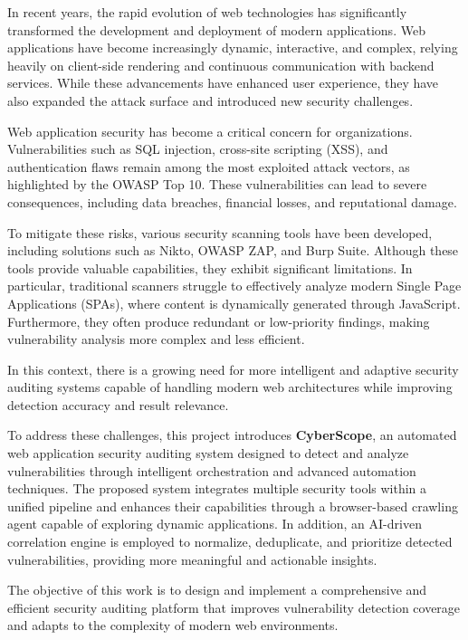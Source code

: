 \indent In recent years, the rapid evolution of web technologies has significantly transformed the development and deployment of modern applications. Web applications have become increasingly dynamic, interactive, and complex, relying heavily on client-side rendering and continuous communication with backend services. While these advancements have enhanced user experience, they have also expanded the attack surface and introduced new security challenges.

\indent Web application security has become a critical concern for organizations. Vulnerabilities such as SQL injection, cross-site scripting (XSS), and authentication flaws remain among the most exploited attack vectors, as highlighted by the OWASP Top 10. These vulnerabilities can lead to severe consequences, including data breaches, financial losses, and reputational damage.

\indent To mitigate these risks, various security scanning tools have been developed, including solutions such as Nikto, OWASP ZAP, and Burp Suite. Although these tools provide valuable capabilities, they exhibit significant limitations. In particular, traditional scanners struggle to effectively analyze modern Single Page Applications (SPAs), where content is dynamically generated through JavaScript. Furthermore, they often produce redundant or low-priority findings, making vulnerability analysis more complex and less efficient.

\indent In this context, there is a growing need for more intelligent and adaptive security auditing systems capable of handling modern web architectures while improving detection accuracy and result relevance.

\indent To address these challenges, this project introduces \textbf{CyberScope}, an automated web application security auditing system designed to detect and analyze vulnerabilities through intelligent orchestration and advanced automation techniques. The proposed system integrates multiple security tools within a unified pipeline and enhances their capabilities through a browser-based crawling agent capable of exploring dynamic applications. In addition, an AI-driven correlation engine is employed to normalize, deduplicate, and prioritize detected vulnerabilities, providing more meaningful and actionable insights.

\indent The objective of this work is to design and implement a comprehensive and efficient security auditing platform that improves vulnerability detection coverage  and adapts to the complexity of modern web environments.